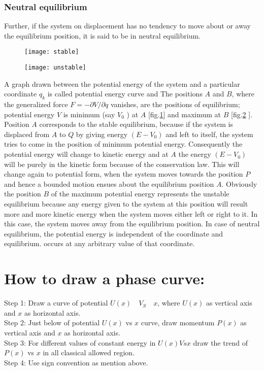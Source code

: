 \subsubsection{Neutral equilibrium}
Further, if the system on displacement has no tendency to move about or away the equilibrium position, it is said to be in neutral equilibrium.\\
\begin{minipage}{0.5\textwidth}
	\begin{figure}[H]
		\centering
		\texttt{[image: stable]}
		\caption{}
		\label{fig1}
	\end{figure}
\end{minipage}
\begin{minipage}{0.5\textwidth}
	\begin{figure}[H]
		\centering
		\texttt{[image: unstable]}
		\caption{}
		\label{fig2}
	\end{figure}
\end{minipage}
A graph drawn between the potential energy of the system and a particular coordinate $q_{k}$ is called potential energy curve and  The positions $A$ and $B$, where the generalized force $F=-\partial V / \partial q$ vanishes, are the positions of equilibrium; potential energy $V$ is minimum (say $V_{0}$ ) at $A$ [fig.\ref{fig1}] and maximum at $B$ [fig.\ref{fig2} ]. Position $A$ corresponds to the stable equilibrium, because if the system is displaced from $A$ to $Q$ by giving energy $\left(E-V_{0}\right)$ and left to itself, the system tries to come in the position of minimum potential energy. Consequently the potential energy will change to kinetic energy and at $A$ the energy $\left(E-V_{0}\right)$ will be purely in the kinetic form because of the conservation law. This will change again to potential form, when the system moves towards the position $P$ and hence a bounded motion ensues about the equilibrium position $A$. Obviously the position $B$ of the maximum potential energy represents the unstable equilibrium because any energy given to the system at this position will result more and more kinetic energy when the system moves either left or right to it. In this case, the system moves away from the equilibrium position. In case of neutral equilibrium, the potential energy is independent of the coordinate and equilibrium. occurs at any arbitrary value of that coordinate.



\section{How to draw a phase curve:}
Step 1: Draw a curve of potential $U(x)\quad V_{S} \quad x$, where $U(x)$ as vertical axis and $x$ as horizontal axis.\\
Step 2: Just below of potential $U(x)$ vs $x$ curve, draw momentum $P(x)$ as vertical axis and $x$ as horizontal axis.\\
Step 3: For different values of constant energy in $U(x) V s x$ draw the trend of $P(x)$ vs $x$ in all classical allowed region.\\
Step 4: Use sign convention as mention above.




